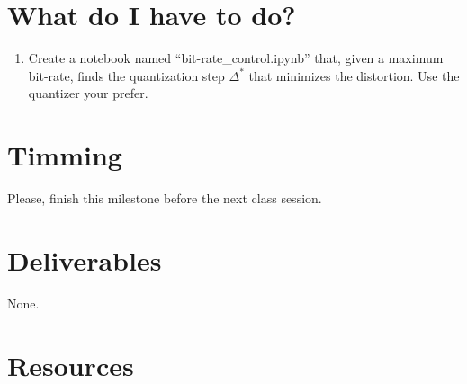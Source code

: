 

\section{What do I have to do?}

\begin{enumerate}
\item Create a notebook named ``bit-rate\_control.ipynb'' that, given
  a maximum bit-rate, finds the quantization step $\Delta^*$ that
  minimizes the distortion. Use the quantizer your prefer.
\end{enumerate}


\section{Timming}

Please, finish this milestone before the next class session.

\section{Deliverables}

None.

\section{Resources}

\renewcommand{\addcontentsline}[3]{} %

